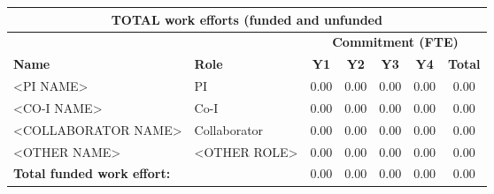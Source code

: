 \begin{table}[htbp]
\begin{center}
\begin{tabular}{|l|l|c|c|c|c|c|}
\multicolumn{7}{|c|}{\textbf{TOTAL work efforts (funded and unfunded}} \\
\hline
\multicolumn{1}{|l|}{}&\multicolumn{1}{|l|}{} & \multicolumn{5}{|c|}{\textbf{Commitment (FTE)}} \\
\cline{3-7}
\bf{Name} & \bf{Role} & \bf{Y1} & \bf{Y2} & \bf{Y3} & \bf{Y4} & \bf{Total} \\
\hline
<PI NAME> & PI & 0.00 & 0.00 & 0.00 & 0.00 & 0.00 \\
<CO-I NAME> & Co-I &  0.00 & 0.00 & 0.00 & 0.00 & 0.00 \\
<COLLABORATOR NAME> & Collaborator & 0.00 & 0.00 & 0.00 & 0.00 & 0.00 \\
<OTHER NAME> & <OTHER ROLE> &  0.00 & 0.00 & 0.00 & 0.00 & 0.00 \\
\hline
\multicolumn{2}{|l|}{\textbf{Total funded work effort:}} & 0.00 & 0.00 & 0.00 & 0.00 & 0.00\\
\hline

\end{tabular}
\end{center}
\label{tbl:fundedWork}
\end{table}